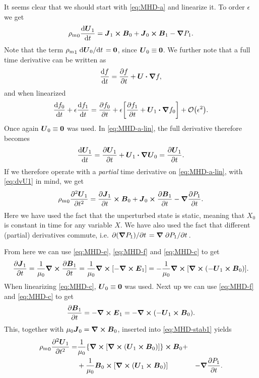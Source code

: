 \documentclass[11pt,a4paper, 
swedish, english %
]{article}
\newcommand{\rhom}{\ensuremath{{\rho_{\text{m}}}}}
\begin{document}
It seems clear that we should start with \eqref{eq:MHD-a} and
linearize it. To order $\epsilon$ we get
\begin{equation}\label{eq:MHD-a-lin}
\rhom_0\dv{\vb*U_1}{t} = 
\vb*J_1\cross\vb*B_0+\vb*J_0\cross\vb*B_1-\grad P_1.
\end{equation}
Note that the term $\rhom_1\dv*{\vb*U_0}{t}=\vb0$, since
$\vb*U_0\equiv\vb0$. We further note that a full time derivative can
be written as
\begin{equation}
\dv{f}{t}=\pdv{f}{t}+\vb*U\vdot\grad{f},
\end{equation}
and when linearized
\begin{equation}\label{eq:dv-lin}
\dv{f_0}{t}+\epsilon\dv{f_1}{t}=
\pdv{f_0}{t}
+\epsilon\qty[\pdv{f_1}{t}+\vb*U_1\vdot\grad{f_0}]
+\order{\epsilon^2}.
\end{equation}
Once again $\vb*U_0\equiv\vb0$ was used.
In \eqref{eq:MHD-a-lin}, the full derivative therefore becomes
\begin{equation}\label{eq:dvU1}
\dv{\vb*U_1}{t}=\pdv{\vb*U_1}{t}+\vb*U_1\vdot\grad\vb*U_0
=\pdv{\vb*U_1}{t}.
\end{equation}
If we therefore operate with a \emph{partial} time derivative on
\eqref{eq:MHD-a-lin}, with \eqref{eq:dvU1} in mind, we get
\begin{equation}\label{eq:MHD-stab1}
\rhom_0\pdv[2]{\vb*U_1}{t} = 
\pdv{\vb*J_1}{t}\cross\vb*B_0
+\vb*J_0\cross\pdv{\vb*B_1}{t}-\grad \pdv{P_1}{t}.
\end{equation}
Here we have used the fact that the unperturbed state is static,
meaning that $X_0$ is constant in time for any variable $X$. We have
also used the fact that different (partial) derivatives commute, i.e. 
$\pdv*{(\grad P_1)}{t}=\grad\pdv*{P_1}{t}$.

From here we can use \eqref{eq:MHD-e}, \eqref{eq:MHD-f} and
\eqref{eq:MHD-c} to get 
\begin{equation}
\pdv{\vb*J_1}{t}=\frac{1}{\mu_0}\curl\pdv{\vb*B_1}{t}
=\frac{1}{\mu_0}\curl\qty[-\curl\vb*E_1]
=-\frac{1}{\mu_0}\curl\qty[\curl\qty(-\vb*U_1\cross\vb*B_0)].
\end{equation}
When linearizing \eqref{eq:MHD-c}, $\vb*U_0\equiv\vb0$ was used. 
Next up we can use \eqref{eq:MHD-f} and \eqref{eq:MHD-c} to get
\begin{equation}
\pdv{\vb*B_1}{t}=-\curl\vb*E_1
=-\curl\qty(-\vb*U_1\cross\vb*B_0).
\end{equation}
This, together with $\mu_0\vb*J_0=\curl\vb*B_0$, inserted into
\eqref{eq:MHD-stab1} yields
\begin{equation}\label{eq:MHD-stab2}
\begin{aligned}
\rhom_0\pdv[2]{\vb*U_1}{t} =& 
\frac{1}{\mu_0}\qty{\curl\qty[\curl\qty(\vb*U_1\cross\vb*B_0)]}
\cross\vb*B_0+\\
&+\frac{1}{\mu_0}\vb*B_0\cross
\qty[\curl\qty(\vb*U_1\cross\vb*B_0)]
&-\grad \pdv{P_1}{t}.
\end{aligned}
\end{equation}
\end{document}
